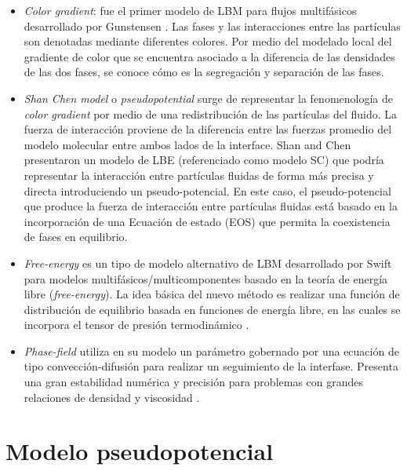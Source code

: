 \begin{itemize}
	
	\item \textit{Color gradient}: fue el primer modelo de LBM para flujos multifásicos desarrollado por Gunstensen \cite{gunstensen1991lattice}. Las fases y las interacciones entre las partículas son denotadas mediante diferentes colores. Por medio del modelado local del gradiente de color que se encuentra asociado a la diferencia de las densidades de las dos fases, se conoce cómo es la segregación y separación de las fases.
	
	\newpage
	\item \textit{Shan Chen model} o \textit{pseudopotential} surge de representar la fenomenología de \textit{color gradient} por medio de una redistribución de las partículas del fluido. La fuerza de interacción proviene de la diferencia entre las fuerzas promedio del modelo molecular  entre ambos lados de la interface. Shan and Chen \cite{shan1993lattice} presentaron un modelo de LBE (referenciado como modelo SC) que podría representar la interacción entre partículas fluidas de forma más precisa y directa introduciendo un pseudo-potencial. En este caso, el pseudo-potencial que produce la fuerza de interacción entre partículas fluidas está basado en la incorporación de una Ecuación de estado (EOS) que permita la coexistencia de fases en equilibrio.
	
	\item \textit{Free-energy} es un tipo de modelo alternativo de LBM desarrollado por Swift \cite{swift1995lattice} para modelos multifásicos/multicomponentes basado en la teoría de energía libre (\textit{free-energy}). La idea básica del nuevo método es realizar una función de distribución de equilibrio basada en funciones de energía libre, en las cuales se incorpora el tensor de presión termodinámico \cite{guo2013lattice}.
	
	\item \textit{Phase-field} utiliza en su modelo un parámetro gobernado por una ecuación de tipo convección-difusión para realizar un seguimiento de la interfase. Presenta una gran estabilidad numérica y precisión para problemas con grandes relaciones de densidad y viscosidad \cite{wang2019brief}.
	
	
\end{itemize}





\section{Modelo pseudopotencial}

